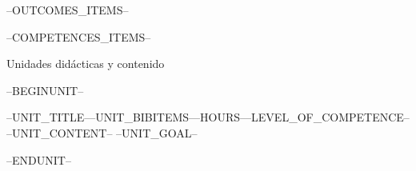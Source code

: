 \begin{syllabus}


\begin{outcomes}
--OUTCOMES_ITEMS--
\end{outcomes}

\begin{competences}
--COMPETENCES_ITEMS--
\end{competences}




\begin{syllabus-section}{Unidades didácticas y contenido}%
\end{syllabus-section}%
 
--BEGINUNIT--
\begin{unit}{--UNIT_TITLE--}{}{--UNIT_BIBITEMS--}{--HOURS--}{--LEVEL_OF_COMPETENCE--}
--UNIT_CONTENT--
--UNIT_GOAL--
\end{unit}

--ENDUNIT--

\begin{coursebibliography}
\end{coursebibliography}

\end{syllabus}

%
